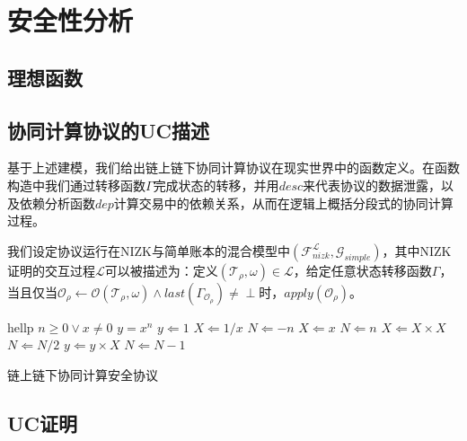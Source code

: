 \section{安全性分析}
\subsection{理想函数}

\subsection{协同计算协议的UC描述}
基于上述建模，我们给出链上链下协同计算协议在现实世界中的函数定义。在函数构造中我们通过转移函数$\Gamma$完成状态的转移，并用$desc$来代表协议的数据泄露，以及依赖分析函数$dep$计算交易中的依赖关系，从而在逻辑上概括分段式的协同计算过程。

我们设定协议运行在NIZK与简单账本的混合模型中$(\mathcal{F}_{nizk}^\mathcal{L}, \mathcal{G}_{simple})$，其中NIZK证明的交互过程$\mathcal{L}$可以被描述为：定义$(\mathcal{T}_\rho, \omega) \in \mathcal{L}$，给定任意状态转移函数$\Gamma$，当且仅当$\mathcal{O}_\rho \leftarrow \mathcal{O}(\mathcal{T}_\rho, \omega)\wedge last(\Gamma_{\mathcal{O}_\rho}) \neq \perp$时，$apply(\mathcal{O}_\rho)$。

\begin{algorithm}[H]
    \begin{algorithmic} 
        \STATE hellp
        \REQUIRE $n \geq 0 \vee x \neq 0$
        \ENSURE $y = x^n$
        \STATE $y \Leftarrow 1$
            \STATE $X \Leftarrow 1 / x$
            \STATE $N \Leftarrow -n$
        \ELSE
            \STATE $X \Leftarrow x$
            \STATE $N \Leftarrow n$
        \ENDIF
                \STATE $X \Leftarrow X \times X$
                \STATE $N \Leftarrow N / 2$
            \ELSE[$N$ is odd]
                \STATE $y \Leftarrow y \times X$
                \STATE $N \Leftarrow N - 1$
            \ENDIF
        \ENDWHILE
    \end{algorithmic}
    \caption{\label{alg:function}链上链下协同计算安全协议}
\end{algorithm}

\subsection{UC证明}
